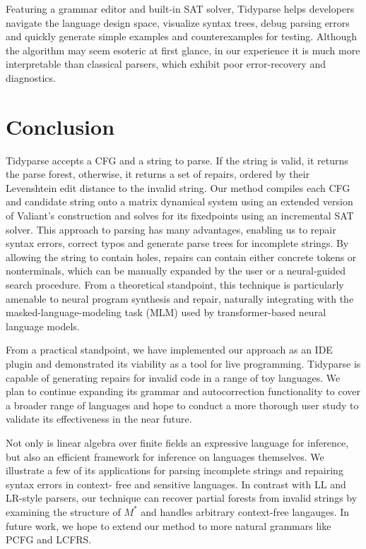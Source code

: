 \documentclass[sigplan,review,anonymous,acmsmall]{acmart}\settopmatter{printfolios=false,printccs=false,printacmref=false}
\begin{document}
Featuring a grammar editor and built-in SAT solver, Tidyparse helps developers navigate the language design space, visualize syntax trees, debug parsing errors and quickly generate simple examples and counterexamples for testing. Although the algorithm may seem esoteric at first glance, in our experience it is much more interpretable than classical parsers, which exhibit poor error-recovery and diagnostics.

\section{Conclusion}

Tidyparse accepts a CFG and a string to parse. If the string is valid, it returns the parse forest, otherwise, it returns a set of repairs, ordered by their Levenshtein edit distance to the invalid string. Our method compiles each CFG and candidate string onto a matrix dynamical system using an extended version of Valiant's construction and solves for its fixedpoints using an incremental SAT solver. This approach to parsing has many advantages, enabling us to repair syntax errors, correct typos and generate parse trees for incomplete strings. By allowing the string to contain holes, repairs can contain either concrete tokens or nonterminals, which can be manually expanded by the user or a neural-guided search procedure. From a theoretical standpoint, this technique is particularly amenable to neural program synthesis and repair, naturally integrating with the masked-language-modeling task (MLM) used by transformer-based neural language models.

From a practical standpoint, we have implemented our approach as an IDE plugin and demonstrated its viability as a tool for live programming. Tidyparse is capable of generating repairs for invalid code in a range of toy languages. We plan to continue expanding its grammar and autocorrection functionality to cover a broader range of languages and hope to conduct a more thorough user study to validate its effectiveness in the near future. %

Not only is linear algebra over finite fields an expressive language for inference, but also an efficient framework for inference on languages themselves. We illustrate a few of its applications for parsing incomplete strings and repairing syntax errors in context- free and sensitive languages. In contrast with LL and LR-style parsers, our technique can recover partial forests from invalid strings by examining the structure of $M^*$ and handles arbitrary context-free langauges. In future work, we hope to extend our method to more natural grammars like PCFG and LCFRS.
\end{document}
